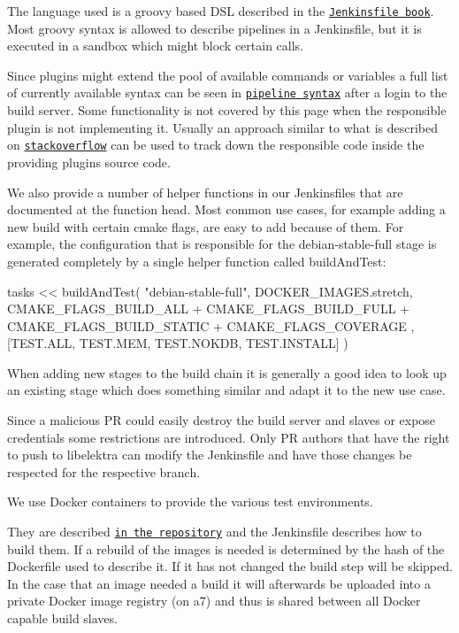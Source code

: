 The language used is a groovy based D\+SL described in the \href{https://jenkins.io/doc/book/pipeline/jenkinsfile/}{\tt Jenkinsfile book}. Most groovy syntax is allowed to describe pipelines in a Jenkinsfile, but it is executed in a sandbox which might block certain calls.

Since plugins might extend the pool of available commands or variables a full list of currently available syntax can be seen in \href{https://build.libelektra.org/job/libelektra/pipeline-syntax/}{\tt pipeline syntax} after a login to the build server. Some functionality is not covered by this page when the responsible plugin is not implementing it. Usually an approach similar to what is described on \href{https://stackoverflow.com/questions/51103359/jenkins-pipeline-return-value-of-build-step}{\tt stackoverflow} can be used to track down the responsible code inside the providing plugins source code.

We also provide a number of helper functions in our Jenkinsfiles that are documented at the function head. Most common use cases, for example adding a new build with certain cmake flags, are easy to add because of them. For example, the configuration that is responsible for the {\ttfamily debian-\/stable-\/full} stage is generated completely by a single helper function called {\ttfamily build\+And\+Test}\+:


\begin{DoxyCode}
tasks << buildAndTest(
  "debian-stable-full",
  DOCKER\_IMAGES.stretch,
  CMAKE\_FLAGS\_BUILD\_ALL +
    CMAKE\_FLAGS\_BUILD\_FULL +
    CMAKE\_FLAGS\_BUILD\_STATIC +
    CMAKE\_FLAGS\_COVERAGE
  ,
  [TEST.ALL, TEST.MEM, TEST.NOKDB, TEST.INSTALL]
)
\end{DoxyCode}


When adding new stages to the build chain it is generally a good idea to look up an existing stage which does something similar and adapt it to the new use case.

Since a malicious PR could easily destroy the build server and slaves or expose credentials some restrictions are introduced. Only PR authors that have the right to push to libelektra can modify the Jenkinsfile and have those changes be respected for the respective branch.

We use Docker containers to provide the various test environments.

They are described \href{https://master.libelektra.org/scripts/docker}{\tt in the repository} and the Jenkinsfile describes how to build them. If a rebuild of the images is needed is determined by the hash of the Dockerfile used to describe it. If it has not changed the build step will be skipped. In the case that an image needed a build it will afterwards be uploaded into a private Docker image registry (on a7) and thus is shared between all Docker capable build slaves.

